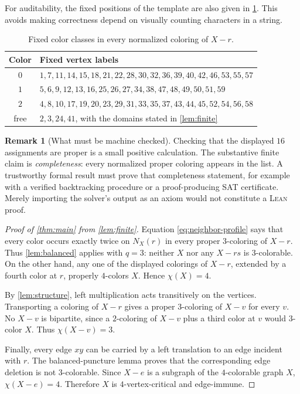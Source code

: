 \documentclass[10pt]{amsart}
\newcommand{\lean}{\textsc{Lean}}
\theoremstyle{definition}
\newtheorem{remark}[theorem]{Remark}
\begin{document}
For auditability, the fixed positions of the template are also given in
\cref{tab:template}.  This avoids making correctness depend on visually
counting characters in a string.

\begin{table}[ht]
\centering
\caption{Fixed color classes in every normalized coloring of $X-r$.}
\label{tab:template}
\small
\begin{tabularx}{\linewidth}{@{}c>{\raggedright\arraybackslash}X@{}}
\toprule
Color & Fixed vertex labels\\
\midrule
$0$ & $1,7,11,14,15,18,21,22,28,30,32,36,39,40,42,46,53,55,57$\\
$1$ & $5,6,9,12,13,16,25,26,27,34,38,47,48,49,50,51,59$\\
$2$ & $4,8,10,17,19,20,23,29,31,33,35,37,43,44,45,52,54,56,58$\\
free & $2,3,24,41$, with the domains stated in \cref{lem:finite}\\
\bottomrule
\end{tabularx}
\end{table}

\begin{remark}[What must be machine checked]
Checking that the displayed $16$ assignments are proper is a small positive
calculation.  The substantive finite claim is \emph{completeness}: every
normalized proper coloring appears in the list.  A trustworthy formal result
must prove that completeness statement, for example with a verified
backtracking procedure or a proof-producing SAT certificate.  Merely importing
the solver's output as an axiom would not constitute a \lean{} proof.
\end{remark}

\begin{proof}[Proof of \cref{thm:main} from \cref{lem:finite}]
Equation \eqref{eq:neighbor-profile} says that every color occurs exactly
twice on $N_X(r)$ in every proper $3$-coloring of $X-r$.  Thus
\cref{lem:balanced} applies with $q=3$: neither $X$ nor any $X-rs$ is
$3$-colorable.  On the other hand, any one of the displayed colorings of
$X-r$, extended by a fourth color at $r$, properly $4$-colors $X$.  Hence
$\chi(X)=4$.

By \cref{lem:structure}, left multiplication acts transitively on the
vertices.  Transporting a coloring of $X-r$ gives a proper $3$-coloring of
$X-v$ for every $v$.  No $X-v$ is bipartite, since a $2$-coloring of $X-v$
plus a third color at $v$ would $3$-color $X$.  Thus $\chi(X-v)=3$.

Finally, every edge $xy$ can be carried by a left translation to an edge
incident with $r$.  The balanced-puncture lemma proves that the corresponding
edge deletion is not $3$-colorable.  Since $X-e$ is a subgraph of the
$4$-colorable graph $X$, $\chi(X-e)=4$.  Therefore $X$ is
$4$-vertex-critical and edge-immune.
\end{proof}
\end{document}
